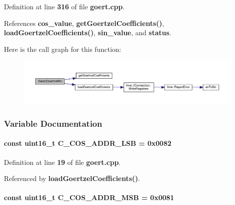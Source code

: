 Definition at line {\bf 316} of file {\bf goert.\+cpp}.



References {\bf cos\+\_\+value}, {\bf get\+Goertzel\+Coefficients()}, {\bf load\+Goertzel\+Coefficients()}, {\bf sin\+\_\+value}, and {\bf status}.



Here is the call graph for this function\+:
\nopagebreak
\begin{figure}[H]
\begin{center}
\leavevmode
\includegraphics[width=350pt]{de/dc9/goert_8cpp_acf1aa2102c392ac6485803d006849e8c_cgraph}
\end{center}
\end{figure}




\subsubsection{Variable Documentation}
\paragraph[{C\+\_\+\+C\+O\+S\+\_\+\+A\+D\+D\+R\+\_\+\+L\+SB}]{\setlength{\rightskip}{0pt plus 5cm}const uint16\+\_\+t C\+\_\+\+C\+O\+S\+\_\+\+A\+D\+D\+R\+\_\+\+L\+SB = 0x0082\hspace{0.3cm}{\ttfamily [static]}}\label{goert_8cpp_a5a7c2ec7d6851e85a7ab235d60e407b5}


Definition at line {\bf 19} of file {\bf goert.\+cpp}.



Referenced by {\bf load\+Goertzel\+Coefficients()}.

\paragraph[{C\+\_\+\+C\+O\+S\+\_\+\+A\+D\+D\+R\+\_\+\+M\+SB}]{\setlength{\rightskip}{0pt plus 5cm}const uint16\+\_\+t C\+\_\+\+C\+O\+S\+\_\+\+A\+D\+D\+R\+\_\+\+M\+SB = 0x0081\hspace{0.3cm}{\ttfamily [static]}}\label{goert_8cpp_ab8272eca05dc49b9c11f06bf2842a900}


